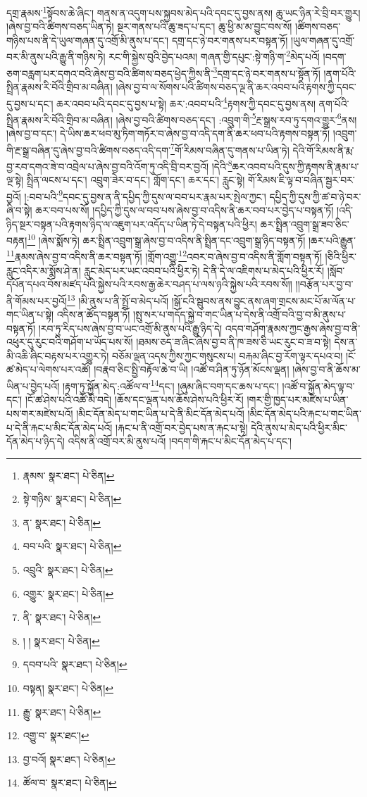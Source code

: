 དགྲ་རྣམས་\footnote{རྣམས་  སྣར་ཐང་།  པེ་ཅིན། }སྟོབས་ཆེ་ཞིང་། གནས་ན་འདུག་པས་སྐྱབས་མེད་པའི་དབང་དུ་བྱས་ནས། ཆུ་ཡང་ཉིན་རེ་བྲི་བར་གྱུར། །ཞེས་བྱ་བའི་ཚིགས་བཅད་ཡིན་ཏེ། སྔར་གནས་པའི་ཆུ་ཟད་པ་དང་། ཆུ་ཕྱི་མ་མ་བྱུང་བས་སོ། །ཚིགས་བཅད་གཉིས་པས་ནི་དེ་ཡུལ་གཞན་དུ་འགྲོ་མི་ནུས་པ་དང་། དགྲ་དང་ཉེ་བར་གནས་པར་བསྟན་ཏོ། །ཡུལ་གཞན་དུ་འགྲོ་བར་མི་ནུས་པའི་རྒྱུ་ནི་གཉིས་ཏེ། རང་གི་སྐྱེས་བུའི་བྱེད་པའམ། གཞན་གྱི་དཔུང་:སྟེ་གཉི་ག་\footnote{སྟེ་གཉིས་  སྣར་ཐང་།  པེ་ཅིན། }མེད་པའོ། །བདག་ཅག་བརླག་པར་དགའ་བའི་ཞེས་བྱ་བའི་ཚིགས་བཅད་ཕྱེད་ཀྱིས་ནི་\footnote{ན་  སྣར་ཐང་།  པེ་ཅིན། }དགྲ་དང་ཉེ་བར་གནས་པ་སྟོན་ཏོ། །ནག་པོའི་སྤྲིན་རྣམས་རི་བོའི་གྲིབ་མ་བཞིན། །ཞེས་བྱ་བ་ལ་སོགས་པའི་ཚིགས་བཅད་ལྔ་ནི་ཆར་འབབ་པའི་རྟགས་ཀྱི་དབང་དུ་བྱས་པ་དང་། ཆར་འབབ་པའི་དབང་དུ་བྱས་པ་སྟེ། ཆར་:འབབ་པའི་\footnote{བབ་པའི་  སྣར་ཐང་།  པེ་ཅིན། }རྟགས་ཀྱི་དབང་དུ་བྱས་ནས། ནག་པོའི་སྤྲིན་རྣམས་རི་བོའི་གྲིབ་མ་བཞིན། །ཞེས་བྱ་བའི་ཚིགས་བཅད་དང་། :འབྲུག་གི་\footnote{འབྲུའི་  སྣར་ཐང་།  པེ་ཅིན། }རྔ་སྒྲས་རབ་ཏུ་དགའ་གྱུར་\footnote{འགྱུར་  སྣར་ཐང་།  པེ་ཅིན། }ནས། །ཞེས་བྱ་བ་དང་། དེ་ཡིས་ཆར་ཕབ་མུ་ཏིག་གཏོར་བ་ཞེས་བྱ་བ་འདི་དག་ནི་ཆར་ཕབ་པའི་རྟགས་བསྟན་ཏོ། །འབྲུག་གི་རྔ་སྒྲ་བཞིན་དུ་ཞེས་བྱ་བའི་ཚིགས་བཅད་འདི་དག་\footnote{ནི་  སྣར་ཐང་།  པེ་ཅིན། }གོ་རིམས་བཞིན་དུ་གནས་པ་ཡིན་ཏེ། དེའི་གོ་རིམས་ནི་རྨ་བྱ་རབ་དགའ་ཟེ་བ་འབྲེལ་པ་ཞེས་བྱ་བའི་འོག་ཏུ་འདི་བྲི་བར་བྱའོ། །དེའི་\footnote{། །  སྣར་ཐང་།  པེ་ཅིན། }ཆར་འབབ་པའི་དུས་ཀྱི་རྟགས་ནི་རྣམ་པ་ལྔ་སྟེ། སྤྲིན་ལངས་པ་དང་། འབྲུག་ཟེར་བ་དང་། གློག་དང་། ཆར་དང་། རླུང་སྟེ། གོ་རིམས་ཇི་ལྟ་བ་བཞིན་སྦྱར་བར་བྱའོ། །:བབ་པའི་\footnote{དབབ་པའི་  སྣར་ཐང་།  པེ་ཅིན། }དབང་དུ་བྱས་ན་ནི་དཔྱིད་ཀྱི་དུས་ལ་བབ་པར་རྣམ་པར་སྤེལ་ཀྱང་། དཔྱིད་ཀྱི་དུས་ཀྱི་ཚ་བ་ཉེ་བར་ཞི་བ་སྟེ། ཆར་བབ་པས་སོ། །དཔྱིད་ཀྱི་དུས་ལ་བབ་པས་ཞེས་བྱ་བ་འདིས་ནི་ཆར་བབ་པར་བྱེད་པ་བསྟན་ཏོ། །འདི་ཉིད་སྔར་བསྟན་པའི་རྟགས་ཉིད་ལ་འཇུག་པར་འདོད་པ་ཡིན་ཏེ་དེ་བསྟན་པའི་ཕྱིར། ཆར་སྤྲིན་འབྲུག་སྒྲ་ཟབ་ཅིང་བརྟན།\footnote{བསྟན།  སྣར་ཐང་།  པེ་ཅིན། } །ཞེས་སྨོས་ཏེ། ཆར་སྤྲིན་འབྲུག་སྒྲ་ཞེས་བྱ་བ་འདིས་ནི་སྤྲིན་དང་འབྲུག་སྒྲ་ཉིད་བསྟན་ཏོ། །ཆར་པའི་རྒྱུན་\footnote{རྒྱུ་  སྣར་ཐང་།  པེ་ཅིན། }རྣམས་ཞེས་བྱ་བ་འདིས་ནི་ཆར་བསྟན་ཏོ། །གློག་འགྱུ་\footnote{འགྱུ་བ་  སྣར་ཐང་། }འབར་བ་ཞེས་བྱ་བ་འདིས་ནི་གློག་བསྟན་ཏོ། །ཅིའི་ཕྱིར་རླུང་འདིར་མ་སྨོས་ཤེ་ན། རླུང་མེད་པར་ཡང་འབབ་པའི་ཕྱིར་ཏེ། དེ་ནི་དེ་ལ་འཇིགས་པ་མེད་པའི་ཕྱིར་རོ། །སློབ་དཔོན་དཔའ་བོས་མཛད་པའི་སྐྱེས་པའི་རབས་རྒྱ་ཆེར་བཤད་པ་ལས་ཉའི་སྐྱེས་པའི་རབས་སོ།། །།བརྩོན་པར་བྱ་བ་ནི་གོམས་པར་བྱའོ།\footnote{བྱ་བའོ།  སྣར་ཐང་།  པེ་ཅིན། } །མི་ནུས་པ་ནི་སྤྲོ་བ་མེད་པའོ། །སྒོ་ངའི་སྦུབས་ནས་བྱུང་ནས་ཞག་གྲངས་མང་པོ་མ་ལོན་པ་གང་ཡིན་པ་སྟེ། འདིས་ན་ཚོད་བསྟན་ཏོ། །སྤུ་སར་པ་གདོད་སྐྱེ་བ་གང་ཡིན་པ་དེས་ནི་འགྲོ་བའི་བྱ་བ་མི་ནུས་པ་བསྟན་ཏོ། །རབ་ཏུ་རིད་པས་ཞེས་བྱ་བ་ཡང་འགྲོ་མི་ནུས་པའི་རྒྱུ་ཉིད་དེ། འདབ་གཤོག་རྣམས་ཀྱང་རྒྱས་ཞེས་བྱ་བ་ནི་འཕུར་དུ་རུང་བའི་གཤོག་པ་ཡོད་པས་སོ། །ཐམས་ཅད་ཟ་ཞིང་ཞེས་བྱ་བ་ནི་ཁ་ཟས་ཅི་ཡང་རུང་བ་ཟ་བ་སྟེ། དེས་ན་མི་འཆི་ཞིང་བརྟས་པར་འགྱུར་ཏེ། བཅོམ་ལྡན་འདས་ཀྱིས་ཀྱང་གསུངས་པ། བརྐམ་ཞིང་བྱ་རོག་ལྟར་དཔའ་བ། །ངོ་ཚ་མེད་པ་ལེགས་པར་འཚོ། །བརྣབ་ཅིང་སྤྱི་བརྟོལ་ཆེ་བ་ཡི། །འཚོ་བ་ཤིན་ཏུ་ཉོན་མོངས་ལྡན། །ཞེས་བྱ་བ་ནི་ཆོས་མ་ཡིན་པ་བྱེད་པའོ། །རྟག་ཏུ་སྐྱོན་མེད་:འཚོལ་བ་\footnote{ཚོལ་བ་  སྣར་ཐང་།  པེ་ཅིན། }དང་། །ཞུམ་ཞིང་བག་དང་ཆས་པ་དང་། །འཚོ་བ་སྐྱོན་མེད་ལྟ་བ་དང་། །ངོ་ཚ་ཤེས་པའི་འཚོ་མི་བདེ། །ཆོས་དང་ལྡན་པས་ཆོས་ཤེས་པའི་ཕྱིར་རོ། །གར་གྱི་ཁྱད་པར་མཛེས་པ་ཡིན་པས་གར་མཛེས་པའོ། །མིང་དོན་མེད་པ་གང་ཡིན་པ་དེ་ནི་མིང་དོན་མེད་པའོ། །མིང་དོན་མེད་པའི་རྐང་པ་གང་ཡིན་པ་དེ་ནི་རྐང་པ་མིང་དོན་མེད་པའོ། །རྐང་པ་ནི་འགྲོ་བར་བྱེད་པས་ན་རྐང་པ་སྟེ། དེའི་ནུས་པ་མེད་པའི་ཕྱིར་མིང་དོན་མེད་པ་ཉིད་དེ། འདིས་ནི་འགྲོ་བར་མི་ནུས་པའོ། །བདག་གི་རྐང་པ་མིང་དོན་མེད་པ་དང་། 